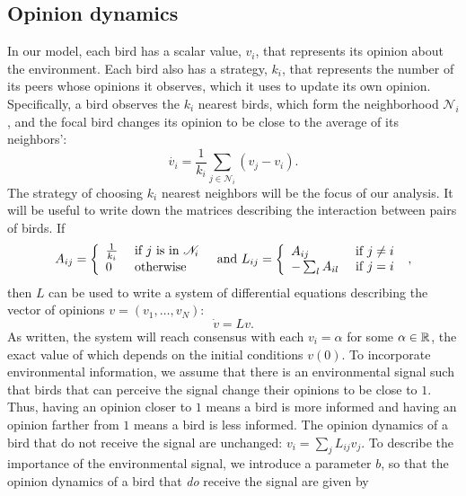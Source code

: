 \documentclass{article}
\begin{document}
\subsection{Opinion dynamics } 
In our model, each bird has a scalar value, $v_i$, that represents its opinion about the environment. Each bird also has a strategy, $k_i$, that represents the number of its peers whose opinions it observes, which it uses to update its own opinion. Specifically, a bird observes the $k_i$ nearest birds, which form the neighborhood $\mathscr{N}_i$, and the focal bird changes its opinion to be close to the average of its neighbors':
\begin{equation*}
\dot{v_i}=\frac{1}{k_i}\sum_{j \in \mathscr{N}_i}(v_j-v_i).
\end{equation*}
The strategy of choosing $k_i$ nearest neighbors will be the focus of our analysis. It will be useful to write down the matrices describing the interaction between pairs of birds.  If 
\begin{equation*}
A_{ij}=\left\{\begin{array}{l l l}
\frac{1}{k_i} & \text{ if $j$ is in $\mathscr{N}_i$ }
\\0 & \text{ otherwise }
\end{array}\right. \text{ and }  L_{ij}=\left\{\begin{array}{l l l}
A_{ij} & \text{ if $j\neq i$ }
\\-\sum_l A_{il} & \text{ if $j=i$ }
\end{array}\right.,
\end{equation*}
then $L$ can be used to write a system of differential equations describing the vector of opinions $v=(v_1,\dots,v_N)$:
\begin{equation*}
\dot{v}=Lv.
\end{equation*}
As written, the system will reach consensus with each $v_i=\alpha$ for some $\alpha\in{\mathbb{R}}$, the exact value of which depends on the initial conditions $v(0)$. To incorporate environmental information, we assume that there is an environmental signal such that birds that can perceive the signal change their opinions to be close to $1$. Thus, having an opinion closer to $1$ means a bird is more informed and having an opinion farther from $1$ means a bird is less informed. The opinion dynamics of a bird that do not receive the signal are unchanged: $v_i=\sum_jL_{ij}v_j$. To describe the importance of the environmental signal, we introduce a parameter $b$, so that the opinion dynamics of a bird that \emph{do} receive the signal are given by
\end{document}
